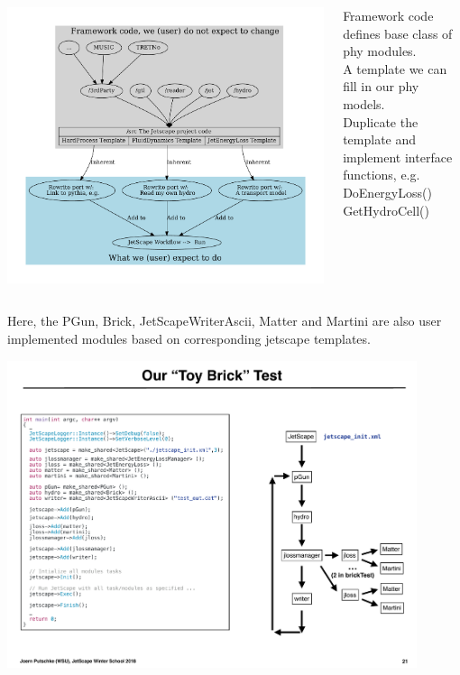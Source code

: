 \documentclass[11pt]{beamer}
\begin{document}
\begin{frame}
\begin{columns}
\begin{column}{0.8\textwidth}
\includegraphics[width=\textwidth]{./framework.pdf}
\end{column}
\begin{column}{0.2\textwidth}
Framework code defines base class of phy modules.\\
\vspace{.5cm}
A template we can fill in our phy models.\\
\vspace{.5cm}
Duplicate the template and implement interface functions, e.g.\\
DoEnergyLoss()\\
GetHydroCell()
\end{column}
\end{columns}
\end{frame}

\begin{frame}
Here, the PGun, Brick, JetScapeWriterAscii, Matter and Martini are also user implemented modules based on corresponding jetscape templates.
\begin{center}
\includegraphics[width=0.9\textwidth]{./talks/p38.pdf}
\end{center}
\end{frame}
\end{document}
